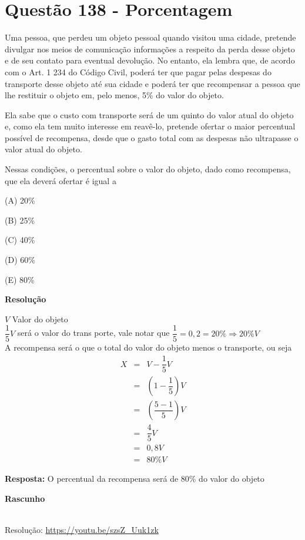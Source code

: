 \section{Questão 138 - Porcentagem}

Uma pessoa, que perdeu um objeto pessoal quando visitou uma cidade, pretende divulgar nos meios de comunicação informações a respeito da perda desse objeto e de seu contato para eventual devolução. 
No entanto, ela lembra que, de acordo com o Art. 1 234 do Código Civil, poderá ter que pagar pelas despesas do transporte desse objeto até sua cidade e poderá ter que recompensar a pessoa que lhe restituir o objeto em, pelo menos, 5\% do valor do objeto. 

Ela sabe que o custo com transporte será de um quinto do valor atual do objeto e, como ela tem muito interesse em reavê-lo, pretende ofertar o maior percentual possível de recompensa, desde que o gasto total com as despesas não ultrapasse o valor atual do objeto.

Nessas condições, o percentual sobre o valor do objeto, dado como recompensa, que ela deverá ofertar é igual a

(A) 20\%

(B) 25\%

(C) 40\%

(D) 60\%

(E) 80\%

\textbf{Resolução}

$ V $ Valor do objeto\\
$ \dfrac{1}{5}V $ será o valor do trans porte, vale notar que $ \dfrac{1}{5} = 0,2 = 20\% \Rightarrow 20\%V $\\
A recompensa será o que o total do valor do objeto menos o transporte, ou seja\\


\begin{eqnarray*}
    X &=& V - \dfrac{1}{5}V \\
      &=& \left(1 - \dfrac{1}{5}\right)V \\
      &=& \left(\dfrac{5 - 1}{5}\right)V \\
      &=& \dfrac{4}{5}V \\
      &=& 0,8V \\
      &=& 80\%V 
\end{eqnarray*}

\textbf{Resposta:} O percentual da recompensa será de 80\% do valor do objeto

\textbf{Rascunho}

\quad
{}\quad


\begin{center}
    \href{https://youtu.be/S22SHYt4n-o}{
    }\\
    Resolução: \url{https://youtu.be/szsZ_Uuk1zk}
\end{center}
